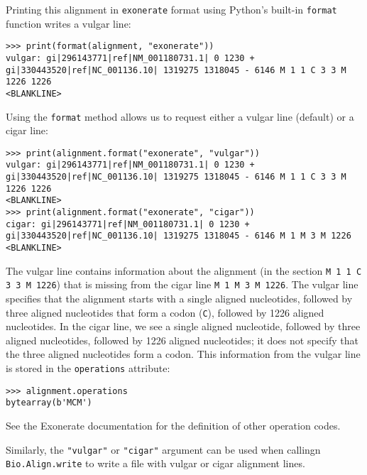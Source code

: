 Printing this alignment in \verb|exonerate| format using Python's built-in \verb|format| function writes a vulgar line:
\begin{verbatim}
>>> print(format(alignment, "exonerate"))
vulgar: gi|296143771|ref|NM_001180731.1| 0 1230 + gi|330443520|ref|NC_001136.10| 1319275 1318045 - 6146 M 1 1 C 3 3 M 1226 1226
<BLANKLINE>
\end{verbatim}
Using the \verb|format| method allows us to request either a vulgar line (default) or a cigar line:
\begin{verbatim}
>>> print(alignment.format("exonerate", "vulgar"))
vulgar: gi|296143771|ref|NM_001180731.1| 0 1230 + gi|330443520|ref|NC_001136.10| 1319275 1318045 - 6146 M 1 1 C 3 3 M 1226 1226
<BLANKLINE>
>>> print(alignment.format("exonerate", "cigar"))
cigar: gi|296143771|ref|NM_001180731.1| 0 1230 + gi|330443520|ref|NC_001136.10| 1319275 1318045 - 6146 M 1 M 3 M 1226
<BLANKLINE>
\end{verbatim}
The vulgar line contains information about the alignment (in the section \verb|M 1 1 C 3 3 M 1226|) that is missing from the cigar line \verb|M 1 M 3 M 1226|. The vulgar line specifies that the alignment starts with a single aligned nucleotides, followed by three aligned nucleotides that form a codon (\verb|C|), followed by 1226 aligned nucleotides. In the cigar line, we see a single aligned nucleotide, followed by three aligned nucleotides, followed by 1226 aligned nucleotides; it does not specify that the three aligned nucleotides form a codon. This information from the vulgar line is stored in the \verb|operations| attribute:
\begin{verbatim}
>>> alignment.operations
bytearray(b'MCM')
\end{verbatim}
See the Exonerate documentation for the definition of other operation codes.

Similarly, the \verb|"vulgar"| or \verb|"cigar"| argument can be used when callingn \verb|Bio.Align.write| to write a file with vulgar or cigar alignment lines.


